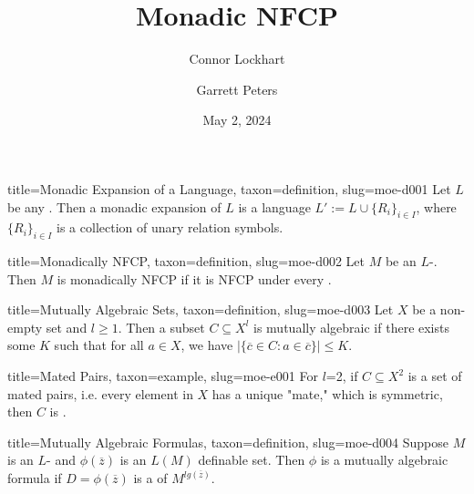 \documentclass[a4paper]{article}
\title{Monadic NFCP}
\date{May 2, 2024}
\author{Connor Lockhart \and Garrett Peters}
\begin{document}
\maketitle

\begin{tree}{title={Monadic Expansion of a Language}, taxon={definition}, slug={moe-d001}}
Let \(L\) be any . Then a monadic expansion of \(L\) is a language \(L':= L \cup \{ R_i \} _{i \in  I}\), where \(\{ R_i \} _{i \in  I}\) is a collection of unary relation symbols.
\end{tree}

\begin{tree}{title={Monadically NFCP}, taxon={definition}, slug={moe-d002}}
Let \(M\) be an \(L\)-. Then \(M\) is monadically NFCP if it is NFCP under every .
\end{tree}

\begin{tree}{title={Mutually Algebraic Sets}, taxon={definition}, slug={moe-d003}}
Let \(X\) be a non-empty set and \(l \geq1\). Then a subset \(C \subseteq  X^l\) is mutually algebraic if there exists some \(K\) such that for all \(a \in  X\), we have \(| \{ \overline {c} \in  C: a \in \overline {c} \} | \leq  K\).
\end{tree}

\begin{tree}{title={Mated Pairs}, taxon={example}, slug={moe-e001}}
For \(l\)=2, if \(C \subseteq  X^2\) is a set of mated pairs, i.e. every element in \(X\) has a unique "mate," which is symmetric, then \(C\) is .
\end{tree}

\begin{tree}{title={Mutually Algebraic Formulas}, taxon={definition}, slug={moe-d004}}
Suppose \(M\) is an \(L\)- and \(\phi ( \overline {z})\) is an \(L(M)\) definable set. Then \(\phi\) is a mutually algebraic formula if \(D= \phi ( \overline {z})\) is a  of \(M^{lg( \overline {z})}\).
\end{tree}

\printbibliography
\end{document}
